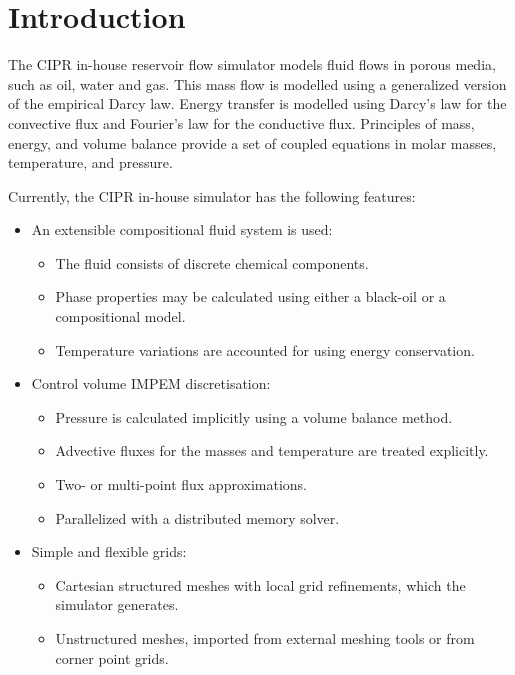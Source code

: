 \chapter{Introduction}

The CIPR in-house reservoir flow simulator models fluid flows in
porous media, such as oil, water and gas. This mass flow is modelled
using a generalized version of the empirical Darcy law. Energy
transfer is modelled using Darcy's law for the convective flux and
Fourier's law for the conductive flux. Principles of mass, energy, and
volume balance provide a set of coupled equations in molar masses,
temperature, and pressure.

Currently, the CIPR in-house simulator has the following features:
\begin{itemize}
\item An extensible compositional fluid system is used:
  \begin{itemize}
  \item The fluid consists of discrete chemical components.
  \item Phase properties may be calculated using either a black-oil or
    a compositional model.
  \item Temperature variations are accounted for using energy
    conservation.
  \end{itemize}
\item Control volume IMPEM discretisation:
  \begin{itemize}
  \item Pressure is calculated implicitly using a volume balance
    method.
  \item Advective fluxes for the masses and temperature are treated
    explicitly.
  \item Two- or multi-point flux approximations.
  \item Parallelized with a distributed memory solver.
  \end{itemize}
\item Simple and flexible grids:
  \begin{itemize}
  \item Cartesian structured meshes with local grid refinements, which
    the simulator generates.
  \item Unstructured meshes, imported from external meshing tools or
    from corner point grids.
  \end{itemize}
\end{itemize}


